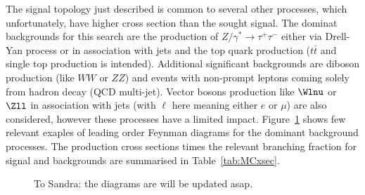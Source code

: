 The signal topology  just described is common to several other processes, which unfortunately, 
have higher cross section than the sought signal.
The dominat backgrounds for this search are the production of  $Z/\gamma^* \rightarrow \tau^+ \tau^- $
either via Drell-Yan process or in association with jets and the top quark production ($t\bar{t}$ and single top production is intended). 
Additional significant backgrounds are  diboson production 
(like $WW$ or $ZZ$) and  events with non-prompt leptons coming solely from hadron decay (QCD multi-jet).
Vector bosons production like  $\Wlnu$ or $\Zll$ in association with jets (with $\ell$ here meaning either $e$ or $\mu$) 
are also considered, however these processes have a limited impact. Figure~\ref{fig:feyndiagBack} shows few relevant exaples of 
leading order Feynman diagrams for the dominant background processes.
The production cross sections times the relevant branching fraction for signal and backgrounds are summarised in
Table~\ref{tab:MCxsec}. 
%

\begin{figure}[tp]
     \begin{center}


    \end{center}
    \caption{To Sandra: the diagrams are will be updated asap.}    
	
   \label{fig:feyndiagBack}
\end{figure}



